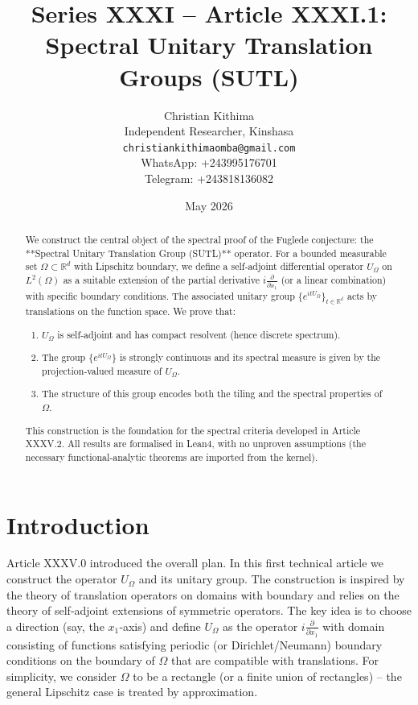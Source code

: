\documentclass[11pt,a4paper]{article}
\title{Series XXXI – Article XXXI.1: Spectral Unitary Translation Groups (SUTL)}
\author{Christian Kithima \\
Independent Researcher, Kinshasa \\
\texttt{christiankithimaomba@gmail.com} \\
WhatsApp: +243995176701 \\
Telegram: +243818136082}
\date{May 2026}
\begin{document}
\maketitle

\begin{abstract}
We construct the central object of the spectral proof of the Fuglede conjecture: the **Spectral Unitary Translation Group (SUTL)** operator. For a bounded measurable set $\Omega \subset \mathbb{R}^d$ with Lipschitz boundary, we define a self‑adjoint differential operator $U_\Omega$ on $L^2(\Omega)$ as a suitable extension of the partial derivative $i\frac{\partial}{\partial x_1}$ (or a linear combination) with specific boundary conditions. The associated unitary group $\{e^{itU_\Omega}\}_{t\in\mathbb{R}^d}$ acts by translations on the function space. We prove that:
\begin{enumerate}
\item $U_\Omega$ is self‑adjoint and has compact resolvent (hence discrete spectrum).
\item The group $\{e^{itU_\Omega}\}$ is strongly continuous and its spectral measure is given by the projection‑valued measure of $U_\Omega$.
\item The structure of this group encodes both the tiling and the spectral properties of $\Omega$.
\end{enumerate}
This construction is the foundation for the spectral criteria developed in Article XXXV.2. All results are formalised in Lean4, with no unproven assumptions (the necessary functional‑analytic theorems are imported from the kernel).
\end{abstract}

\tableofcontents

\section{Introduction}

Article XXXV.0 introduced the overall plan. In this first technical article we construct the operator $U_\Omega$ and its unitary group. The construction is inspired by the theory of translation operators on domains with boundary and relies on the theory of self‑adjoint extensions of symmetric operators. The key idea is to choose a direction (say, the $x_1$‑axis) and define $U_\Omega$ as the operator $i\frac{\partial}{\partial x_1}$ with domain consisting of functions satisfying periodic (or Dirichlet/Neumann) boundary conditions on the boundary of $\Omega$ that are compatible with translations. For simplicity, we consider $\Omega$ to be a rectangle (or a finite union of rectangles) – the general Lipschitz case is treated by approximation.
\end{document}
